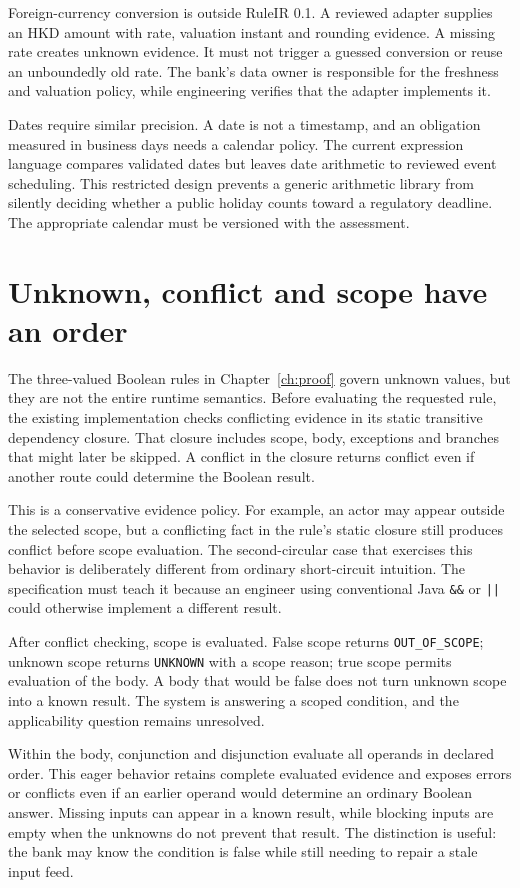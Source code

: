 \documentclass[12pt,a4paper,oneside,openany]{book}
\begin{document}
Foreign-currency conversion is outside RuleIR 0.1. A reviewed adapter supplies an
HKD amount with rate, valuation instant and rounding evidence. A missing rate
creates unknown evidence. It must not trigger a guessed conversion or reuse an
unboundedly old rate. The bank's data owner is responsible for the freshness and
valuation policy, while engineering verifies that the adapter implements it.

Dates require similar precision. A date is not a timestamp, and an obligation
measured in business days needs a calendar policy. The current expression
language compares validated dates but leaves date arithmetic to reviewed event
scheduling. This restricted design prevents a generic arithmetic library from
silently deciding whether a public holiday counts toward a regulatory deadline.
The appropriate calendar must be versioned with the assessment.

\section{Unknown, conflict and scope have an order}

The three-valued Boolean rules in Chapter~\ref{ch:proof} govern unknown values,
but they are not the entire runtime semantics. Before evaluating the requested
rule, the existing implementation checks conflicting evidence in its static
transitive dependency closure. That closure includes scope, body, exceptions and
branches that might later be skipped. A conflict in the closure returns conflict
even if another route could determine the Boolean result.

This is a conservative evidence policy. For example, an actor may appear outside
the selected scope, but a conflicting fact in the rule's static closure still
produces conflict before scope evaluation. The second-circular case that exercises
this behavior is deliberately different from ordinary short-circuit intuition.
The specification must teach it because an engineer using conventional Java
\texttt{\&\&} or \texttt{||} could otherwise implement a different result.

After conflict checking, scope is evaluated. False scope returns
\texttt{OUT\_OF\_SCOPE}; unknown scope returns \texttt{UNKNOWN} with a scope reason;
true scope permits evaluation of the body. A body that would be false does not
turn unknown scope into a known result. The system is answering a scoped
condition, and the applicability question remains unresolved.

Within the body, conjunction and disjunction evaluate all operands in declared
order. This eager behavior retains complete evaluated evidence and exposes errors
or conflicts even if an earlier operand would determine an ordinary Boolean
answer. Missing inputs can appear in a known result, while blocking inputs are
empty when the unknowns do not prevent that result. The distinction is useful:
the bank may know the condition is false while still needing to repair a stale
input feed.
\end{document}
